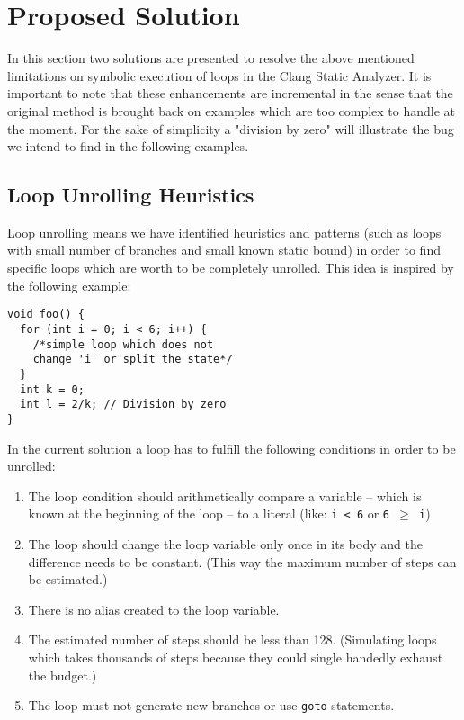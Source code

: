 \documentclass[oneside, a4paper, 12pt]{article}
\theoremstyle{definition}
\begin{document}
\section{Proposed Solution}
In this section two solutions are presented to resolve the above mentioned
limitations on symbolic execution of loops in the Clang Static Analyzer. It 
is important to note that these enhancements are incremental in the sense 
that the original method is brought back on examples which are too complex to handle at the moment. For the sake of simplicity a 
"division by zero" will illustrate the bug we intend to find in the following examples.

\subsection{Loop Unrolling Heuristics}
Loop unrolling means we have identified heuristics and patterns (such as 
loops
with small number of branches and small known static bound) in order to find
specific loops which are worth to be completely unrolled. This idea is 
inspired by the following example:

\begin{lstlisting}
void foo() {
  for (int i = 0; i < 6; i++) {
    /*simple loop which does not
    change 'i' or split the state*/
  }
  int k = 0;
  int l = 2/k; // Division by zero
}\end{lstlisting}

In the current solution a loop has to fulfill the following conditions in order 
to be unrolled:
\begin{enumerate}  
	\item The loop condition should arithmetically compare a variable -- 
	which is known at the beginning of the loop -- to a literal (like: 				\texttt{i~<~6} or \texttt{6~$\ge$~i})
	\item The loop should change the loop variable only once in its body 
	and the	difference needs to be constant. (This way the maximum number of 
	steps can be estimated.)
    \item There is no alias created to the loop variable.
	\item The estimated number of steps should be less than 128. (Simulating 
	loops which takes thousands of steps because they could single handedly 
	exhaust the budget.)
	\item The loop must not generate new branches or use \texttt{goto} 
	statements.
\end{enumerate}
\end{document}
